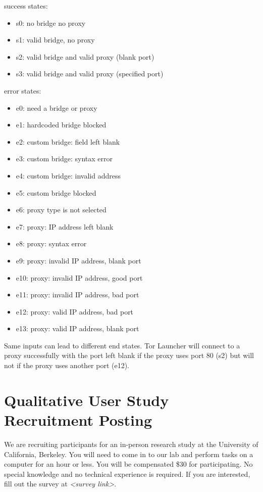 \documentclass[USenglish,oneside,twocolumn]{article}
\begin{document}
\noindent success states: 
\begin{itemize}
\item s0: no bridge no proxy
\item s1: valid bridge, no proxy
\item s2: valid bridge and valid proxy (blank port)
\item s3: valid bridge and valid proxy (specified port)
\end{itemize}

error states:
\begin{itemize} 
\item e0: need a bridge or proxy
\item e1: hardcoded bridge blocked
\item e2: custom bridge: field left blank
\item e3: custom bridge: syntax error
\item e4: custom bridge: invalid address
\item e5: custom bridge blocked
\item e6: proxy type is not selected
\item e7: proxy: IP address left blank
\item e8: proxy: syntax error
\item e9: proxy: invalid IP address, blank port
\item e10: proxy: invalid IP address, good port
\item e11: proxy: invalid IP address, bad port
\item e12: proxy: valid IP address, bad port
\item e13: proxy: valid IP address, blank port
\end{itemize} 

Same inputs can lead to different end states. Tor Launcher will connect to a proxy successfully with the port left blank if the proxy uses port 80 (s2) but will not if the proxy uses another port (e12). 

\section{Qualitative User Study Recruitment Posting} 
\label{qualitative-recruitment}
We are recruiting participants for an in-person research study at the University of California, Berkeley. 
You will need to come in to our lab and perform tasks on a computer for an hour or less. You will be compensated \$30 for participating. 
No special knowledge and no technical experience is required. If you are interested, fill out the survey at \textit{<survey link>}. 
\end{document}
